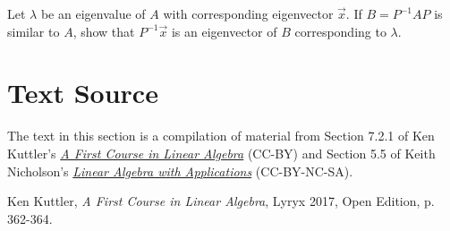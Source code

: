 \documentclass{ximera}
\begin{document}
\begin{problem}\label{prob:similarproperties_ev}
Let $\lambda$ be an eigenvalue of $A$ with corresponding eigenvector $\vec{x}$. If $B = P^{-1}AP$ is similar to $A$, show that $P^{-1}\vec{x}$ is an eigenvector of $B$ corresponding to $\lambda$.
\end{problem}



\section*{Text Source}
The text in this section is a compilation of material from Section 7.2.1 of Ken Kuttler's \href{https://open.umn.edu/opentextbooks/textbooks/a-first-course-in-linear-algebra-2017}{\it A First Course in Linear Algebra} (CC-BY) and Section 5.5 of Keith Nicholson's \href{https://open.umn.edu/opentextbooks/textbooks/linear-algebra-with-applications}{\it Linear Algebra with Applications} (CC-BY-NC-SA).

Ken Kuttler, {\it  A First Course in Linear Algebra}, Lyryx 2017, Open Edition, p. 362-364.

\end{document}
